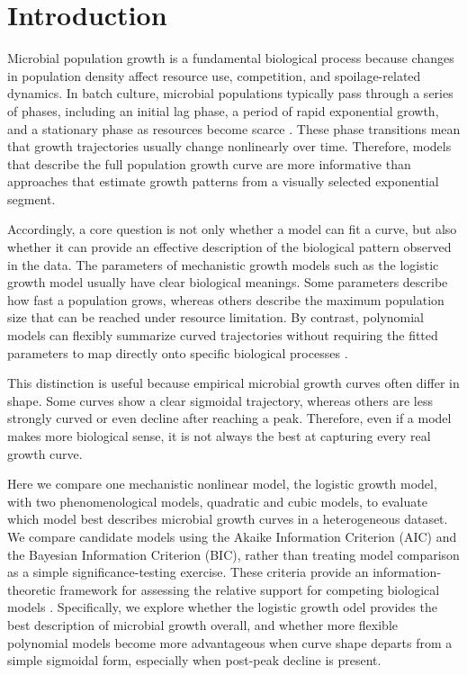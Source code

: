 \documentclass[11pt]{article}
\begin{document}
\section{Introduction}
Microbial population growth is a fundamental biological process because changes in population density affect resource use, competition, and spoilage-related dynamics. In batch culture, microbial populations typically pass through a series of phases, including an initial lag phase, a period of rapid exponential growth, and a stationary phase as resources become scarce \citep{Monod1949,Zwietering1990}. These phase transitions mean that growth trajectories usually change nonlinearly over time. Therefore, models that describe the full population growth curve are more informative than approaches that estimate growth patterns from a visually selected exponential segment.

Accordingly, a core question is not only whether a model can fit a curve, but also whether it can provide an effective description of the biological pattern observed in the data. The parameters of  mechanistic growth models such as the logistic growth model usually have clear biological meanings. Some parameters describe how fast a population grows, whereas others describe the maximum population size that can be reached under resource limitation. By contrast, polynomial models can flexibly summarize curved trajectories without requiring the fitted parameters to map directly onto specific biological processes \citep{WhiteMarshall2019}.

This distinction is useful because empirical microbial growth curves often differ in shape. Some curves show a clear sigmoidal trajectory, whereas others are less strongly curved or even decline after reaching a peak. Therefore, even if a model makes more biological sense, it is not always the best at capturing every real growth curve.

Here we compare one mechanistic nonlinear model, the logistic growth model, with two phenomenological models, quadratic and cubic models, to evaluate which model best describes microbial growth curves in a heterogeneous dataset. We compare candidate models using the Akaike Information Criterion (AIC) and the Bayesian Information Criterion (BIC), rather than treating model comparison as a simple significance-testing exercise. These criteria provide an information-theoretic framework for assessing the relative support for competing biological models \citep{JohnsonOmland2004}. Specifically, we explore whether the logistic growth odel provides the best description of microbial growth overall, and whether more flexible polynomial models become more advantageous when curve shape departs from a simple sigmoidal form, especially when post-peak decline is present.
\end{document}
